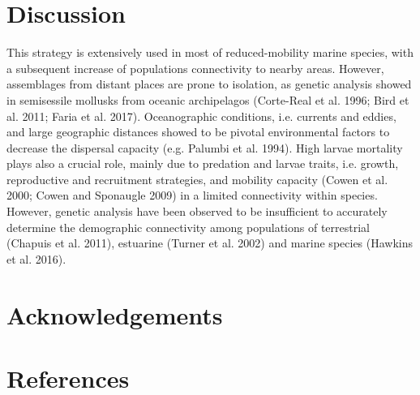 \documentclass[12pt]{article}
\begin{document}
\begin{flushleft}
\section{Discussion}

This strategy is extensively used in most of reduced-mobility marine species, with a subsequent increase of populations connectivity to nearby areas. However, assemblages from distant places are prone to isolation, as genetic analysis showed in semisessile mollusks from oceanic archipelagos (Corte-Real et al. 1996; Bird et al. 2011; Faria et al. 2017). Oceanographic conditions, i.e. currents and eddies, and large geographic distances showed to be pivotal environmental factors to decrease the dispersal capacity (e.g. Palumbi et al. 1994). High larvae mortality plays also a crucial role, mainly due to predation and larvae traits, i.e. growth, reproductive and recruitment strategies, and mobility capacity (Cowen et al. 2000; Cowen and Sponaugle 2009) in a limited connectivity within species. However, genetic analysis have been observed to be insufficient to accurately determine the demographic connectivity among populations of terrestrial (Chapuis et al. 2011), estuarine (Turner et al. 2002) and marine species (Hawkins et al. 2016).


\section{Acknowledgements}




\section{References}


\insertbibliography

\end{flushleft}
\end{document}
